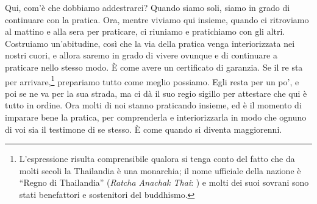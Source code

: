 Qui, com'è che dobbiamo addestrarci? Quando siamo soli, siamo in grado
di continuare con la pratica. Ora, mentre viviamo qui insieme, quando ci
ritroviamo al mattino e alla sera per praticare, ci riuniamo e
pratichiamo con gli altri. Costruiamo un'abitudine, così che la via
della pratica venga interiorizzata nei nostri cuori, e allora saremo in
grado di vivere ovunque e di continuare a praticare nello stesso modo. È
come avere un certificato di garanzia. Se il re sta per
arrivare,\footnote{L'espressione risulta comprensibile qualora si tenga
  conto del fatto che da molti secoli la Thailandia è una monarchia; il
  nome ufficiale della nazione è ``Regno di Thailandia'' (\emph{Ratcha
  Anachak Thai}: ) e molti dei suoi sovrani sono stati
  benefattori e sostenitori del buddhismo.} prepariamo tutto come meglio
possiamo. Egli resta per un po', e poi se ne va per la sua strada, ma ci
dà il suo regio sigillo per attestare che qui è tutto in ordine. Ora
molti di noi stanno praticando insieme, ed è il momento di imparare bene
la pratica, per comprenderla e interiorizzarla in modo che ognuno di voi
sia il testimone di se stesso. È come quando si diventa maggiorenni.

